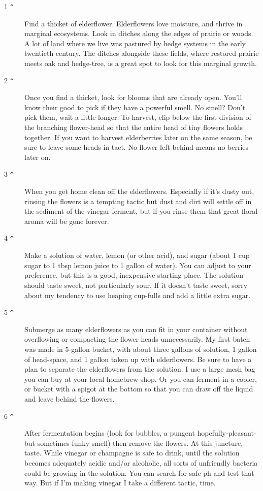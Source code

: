 \documentclass[10pt,a6paper,footinclude=false,firstfoot=false,headinclude=true,open=any,DIV=6]{scrbook} %
\begin{document}
\begin{description}
\item [1 \texttt{\^}] Find a thicket of elderflower. Elderflowers love moisture, and thrive in marginal ecosystems. Look in ditches along the edges of prairie or woods. A lot of land where we live was pastured by hedge systems in the early twentieth century. The ditches alongside these fields, where restored prairie meets oak and hedge-tree, is a great spot to look for this marginal growth.
\item [2 \texttt{\^}] Once you find a thicket, look for blooms that are already open. You'll know their good to pick if they have a powerful smell. No smell? Don't pick them, wait a little longer. To harvest, clip below the first division of the branching flower-head so that the entire head of tiny flowers holds together. If you want to harvest elderberries later on the same season, be sure to leave some heads in tact. No flower left behind means no berries later on.
\item [3 \texttt{\^}] When you get home  clean off the elderflowers. Especially if it's dusty out, rinsing the flowers is a tempting tactic but dust and dirt will settle off in the sediment of the vinegar ferment, but if you rinse them that great floral aroma will be gone forever.
\item [4 \texttt{\^}] Make a solution of water, lemon (or other acid), and sugar (about 1 cup sugar to 1 tbsp lemon juice to 1 gallon of water). You can adjust to your preference, but this is a good, inexpensive starting place. The solution should taste sweet, not particularly sour. If it doesn't taste sweet, sorry about my tendency to use heaping cup-fulls and add a little extra sugar.
\item [5 \texttt{\^}] Submerge as many elderflowers as you can fit in your container without overflowing or compacting the flower heads unnecessarily. My first batch was made in 5-gallon bucket, with about three gallons of solution, 1 gallon of head-space, and 1 gallon taken up with elderflowers. Be sure to have a plan to separate the elderflowers from the solution. I use a large mesh bag you can buy at your local homebrew shop. Or you can ferment in a cooler, or bucket with a spigot at the bottom so that you can draw off the liquid and leave behind the flowers.
\item [6 \texttt{\^}] After fermentation begins (look for bubbles, a pungent hopefully-pleasant-but-sometimes-funky smell) then remove the flowers. At this juncture,  taste. While vinegar or champagne is safe to drink, until the solution becomes adequately acidic and/or alcoholic, all sorts of unfriendly bacteria could be growing in the solution. You can search for safe ph and test that way. But if I'm making vinegar I take a different tactic, time.

\end{description}
\end{document}
